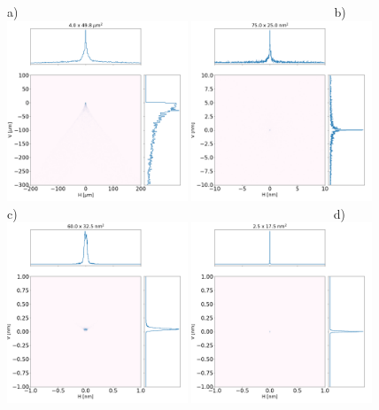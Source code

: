 \documentclass{iucr}              %
\begin{document}
\begin{figure}[h]
\centering
\flushleft
a)~~~~~~~~~~~~~~~~~~~~~~~~~~~~~~~~~~~~~~~~~~~~~~~~~~~b)\\
\includegraphics[width=0.48\textwidth]{figures/bl_point_toroid.png}
\includegraphics[width=0.48\textwidth]{figures/bl_point_parabolic-cone.png} \\
c)~~~~~~~~~~~~~~~~~~~~~~~~~~~~~~~~~~~~~~~~~~~~~~~~~~~d)\\
\includegraphics[width=0.48\textwidth]{figures/bl_point_diaboloid.png}
\includegraphics[width=0.48\textwidth]{figures/bl_point_diaboloid-exact.png}

\end{figure}
\end{document}
